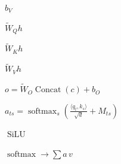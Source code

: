 \documentclass{article}
\begin{document}
\begin{preview}
{\fontsize{24}{28.799999999999997}\selectfont\color[HTML]{222222}$\displaystyle b_{V}$}
\end{preview}
\begin{preview}
{\fontsize{20}{24.0}\selectfont\color[HTML]{222222}$\displaystyle \widetilde{W}_{Q}h$}
\end{preview}
\begin{preview}
{\fontsize{20}{24.0}\selectfont\color[HTML]{222222}$\displaystyle \widetilde{W}_{K}h$}
\end{preview}
\begin{preview}
{\fontsize{20}{24.0}\selectfont\color[HTML]{222222}$\displaystyle \widetilde{W}_{V}h$}
\end{preview}
\begin{preview}
{\fontsize{24}{28.799999999999997}\selectfont\color[HTML]{222222}$\displaystyle o = \widetilde{W}_{O} \operatorname{Concat}(c) + b_{O}$}
\end{preview}
\begin{preview}
{\fontsize{22}{26.4}\selectfont\color[HTML]{222222}$\displaystyle a_{ts}=\operatorname{softmax}_{s}\!\left(\frac{\langle q_t,k_s\rangle}{\sqrt{d}}+M_{ts}\right)$}
\end{preview}
\begin{preview}
{\fontsize{25}{30.0}\selectfont\color[HTML]{222222}$\displaystyle \operatorname{SiLU}$}
\end{preview}
\begin{preview}
{\fontsize{22}{26.4}\selectfont\color[HTML]{222222}$\displaystyle \operatorname{softmax}\to\sum a\,v$}
\end{preview}
\end{document}
